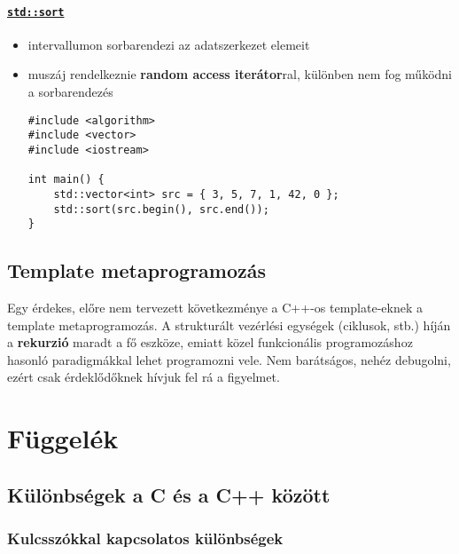 \documentclass[a4paper, 11pt, oneside]{book}
\begin{document}
\subsubsection{\underline{\texttt{std::sort}}}

\begin{itemize}
	\item intervallumon sorbarendezi az adatszerkezet elemeit
	\item muszáj rendelkeznie \textbf{random access iterátor}ral, különben nem fog működni a sorbarendezés
	
		\begin{lstlisting}[style=cppstyle]
#include <algorithm>
#include <vector>
#include <iostream>

int main() {
	std::vector<int> src = { 3, 5, 7, 1, 42, 0 };	
	std::sort(src.begin(), src.end());	
}
	\end{lstlisting}
\end{itemize}

\section{Template metaprogramozás}

Egy érdekes, előre nem tervezett következménye a C++-os template-eknek a template metaprogramozás. A strukturált vezérlési egységek (ciklusok, stb.) híján a \textbf{rekurzió} maradt a fő eszköze, emiatt közel funkcionális programozáshoz hasonló paradigmákkal lehet programozni vele. Nem barátságos, nehéz debugolni, ezért csak érdeklődőknek hívjuk fel rá a figyelmet.

\chapter{Függelék}

\section{Különbségek a C és a C++ között}

\subsection{Kulcsszókkal kapcsolatos különbségek}
\end{document}
